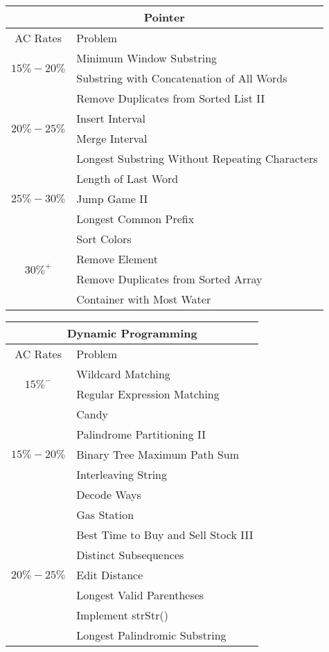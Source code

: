 \documentclass[paper=a4, fontsize=11pt]{scrartcl} %
\begin{document}
\begin{center}
  \vspace{20mm}
  \begin{tabular}{|c|l|}
      \hline
      \multicolumn{2}{|c|}{Pointer} \\
      \hline
      AC Rates      &   Problem     \\
      \hline
      \multirow{2}{*}{$15\%-20\%$}  &    Minimum Window Substring    \\
          & Substring with Concatenation of All Words \\
      \hline
      \multirow{4}{*}{$20\%-25\%$}  &    Remove Duplicates from Sorted List II    \\
          & Insert Interval \\
          & Merge Interval  \\
          & Longest Substring Without Repeating Characters  \\
      \hline
      \multirow{3}{*}{$25\%-30\%$}  &    Length of Last Word    \\
          & Jump Game II  \\
          & Longest Common Prefix \\
      \hline
      \multirow{4}{*}{$30\%^+$}  &  Sort Colors  \\
          & Remove Element \\
          & Remove Duplicates from Sorted Array  \\
          & Container with Most Water \\
      \hline
  \end{tabular}


  \pagebreak

  \begin{tabular}{|c|l|}
      \hline
      \multicolumn{2}{|c|}{Dynamic Programming} \\
      \hline
      AC Rates      &   Problem     \\
      \hline
      \multirow{2}{*}{$15\%^-$}  &   Wildcard Matching\\
          & Regular Expression Matching\\
      \hline
      \multirow{5}{*}{$15\%-20\%$}  &   Candy\\
          & Palindrome Partitioning II  \\
          & Binary Tree Maximum Path Sum \\
          & Interleaving String\\
          & Decode Ways\\
      \hline
      \multirow{7}{*}{$20\%-25\%$}  &   Gas Station    \\
          & Best Time to Buy and Sell Stock III\\
          & Distinct Subsequences \\
          & Edit Distance\\
          & Longest Valid Parentheses\\
          & Implement strStr()\\
          & Longest Palindromic Substring\\


\end{tabular}
\end{center}
\end{document}
